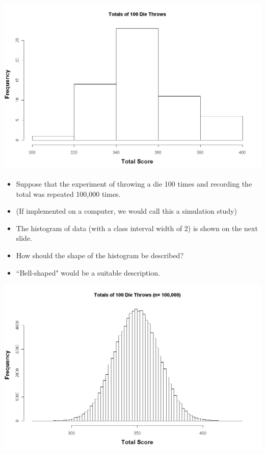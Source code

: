\documentclass[12pt]{report}
\begin{document}
		
		
		\begin{center}
			\includegraphics[scale=0.30]{images/3aDieHist2}
		\end{center}
		
		
		
		
		\begin{itemize}
			\item Suppose that the experiment of throwing a die 100 times and recording the total was repeated 100,000 times.
			\item (If implemented on a computer, we would call this a simulation study)
			\item The histogram of data (with a class interval width of 2) is shown on the next slide.
			\item How should the shape of the histogram be described?
			\item ``Bell-shaped" would be a suitable description.
		\end{itemize}
		
		
		
		
		\begin{center}
			\includegraphics[scale=0.30]{images/3aDieHist3}
		\end{center}
		
\end{document}
